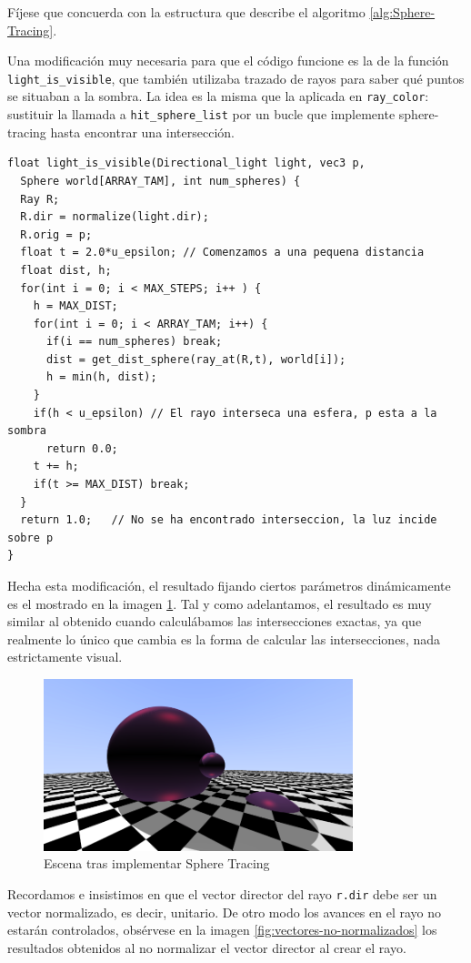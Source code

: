 Fíjese que concuerda con la estructura que describe el algoritmo \ref{alg:Sphere-Tracing}. 

Una modificación muy necesaria para que el código funcione es la de la función \verb|light_is_visible|, que también utilizaba trazado de rayos para saber qué puntos se situaban a la sombra. La idea es la misma que la aplicada en \verb|ray_color|: sustituir la llamada a \verb|hit_sphere_list| por un bucle que implemente sphere-tracing hasta encontrar una intersección.

\begin{lstlisting}
float light_is_visible(Directional_light light, vec3 p, 
  Sphere world[ARRAY_TAM], int num_spheres) {
  Ray R;
  R.dir = normalize(light.dir);
  R.orig = p;
  float t = 2.0*u_epsilon; // Comenzamos a una pequena distancia
  float dist, h;
  for(int i = 0; i < MAX_STEPS; i++ ) {
    h = MAX_DIST;
    for(int i = 0; i < ARRAY_TAM; i++) {
      if(i == num_spheres) break;
      dist = get_dist_sphere(ray_at(R,t), world[i]);
      h = min(h, dist);
    }
    if(h < u_epsilon) // El rayo interseca una esfera, p esta a la sombra
      return 0.0;
    t += h;
    if(t >= MAX_DIST) break;
  }
  return 1.0;   // No se ha encontrado interseccion, la luz incide sobre p
}
\end{lstlisting}

Hecha esta modificación, el resultado fijando ciertos parámetros dinámicamente es el mostrado en la imagen \ref{fig:esferas-ST}. Tal y como adelantamos, el resultado es muy similar al obtenido cuando calculábamos las intersecciones exactas, ya que realmente lo único que cambia es la forma de calcular las intersecciones, nada estrictamente visual.

\begin{figure} [ht]
    \centering
    \includegraphics[width=9cm]{img/C9/esferas-sphere-tracing.png}
    \caption{Escena tras implementar Sphere Tracing}
    \label{fig:esferas-ST}
\end{figure}

Recordamos e insistimos en que el vector director del rayo \verb|r.dir| debe ser un vector normalizado, es decir, unitario. De otro modo los avances en el rayo no estarán controlados, obsérvese en la imagen \ref{fig:vectores-no-normalizados} los resultados obtenidos al no normalizar el vector director al crear el rayo.

